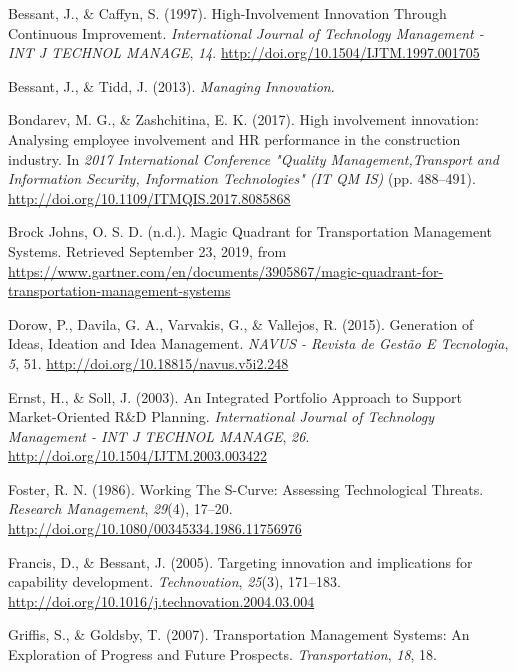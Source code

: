 \documentclass[12pt,twoside]{reedthesis}
\begin{document}
\leavevmode\hypertarget{ref-bessantHighInvolvementInnovationContinuous1997}{}%
Bessant, J., \& Caffyn, S. (1997). High-Involvement Innovation Through Continuous Improvement. \emph{International Journal of Technology Management - INT J TECHNOL MANAGE}, \emph{14}. \url{http://doi.org/10.1504/IJTM.1997.001705}

\leavevmode\hypertarget{ref-bessantManagingInnovation2013}{}%
Bessant, J., \& Tidd, J. (2013). \emph{Managing Innovation}.

\leavevmode\hypertarget{ref-bondarevHighInvolvementInnovation2017}{}%
Bondarev, M. G., \& Zashchitina, E. K. (2017). High involvement innovation: Analysing employee involvement and HR performance in the construction industry. In \emph{2017 International Conference "Quality Management,Transport and Information Security, Information Technologies" (IT QM IS)} (pp. 488--491). \url{http://doi.org/10.1109/ITMQIS.2017.8085868}

\leavevmode\hypertarget{ref-brockjohnsMagicQuadrantTransportation}{}%
Brock Johns, O. S. D. (n.d.). Magic Quadrant for Transportation Management Systems. Retrieved September 23, 2019, from \url{https://www.gartner.com/en/documents/3905867/magic-quadrant-for-transportation-management-systems}

\leavevmode\hypertarget{ref-dorowGenerationIdeasIdeation2015}{}%
Dorow, P., Davila, G. A., Varvakis, G., \& Vallejos, R. (2015). Generation of Ideas, Ideation and Idea Management. \emph{NAVUS - Revista de Gestão E Tecnologia}, \emph{5}, 51. \url{http://doi.org/10.18815/navus.v5i2.248}

\leavevmode\hypertarget{ref-ernstIntegratedPortfolioApproach2003}{}%
Ernst, H., \& Soll, J. (2003). An Integrated Portfolio Approach to Support Market-Oriented R\&D Planning. \emph{International Journal of Technology Management - INT J TECHNOL MANAGE}, \emph{26}. \url{http://doi.org/10.1504/IJTM.2003.003422}

\leavevmode\hypertarget{ref-fosterWorkingSCurveAssessing1986}{}%
Foster, R. N. (1986). Working The S-Curve: Assessing Technological Threats. \emph{Research Management}, \emph{29}(4), 17--20. \url{http://doi.org/10.1080/00345334.1986.11756976}

\leavevmode\hypertarget{ref-francisTargetingInnovationImplications2005}{}%
Francis, D., \& Bessant, J. (2005). Targeting innovation and implications for capability development. \emph{Technovation}, \emph{25}(3), 171--183. \url{http://doi.org/10.1016/j.technovation.2004.03.004}

\leavevmode\hypertarget{ref-griffisTransportationManagementSystems2007}{}%
Griffis, S., \& Goldsby, T. (2007). Transportation Management Systems: An Exploration of Progress and Future Prospects. \emph{Transportation}, \emph{18}, 18.
\end{document}
